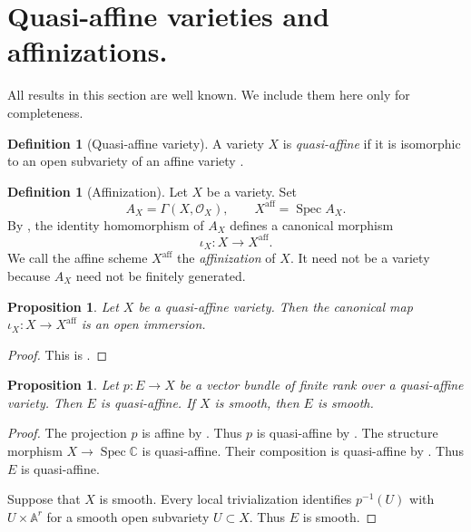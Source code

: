 \documentclass[12pt]{article}
\newtheorem{proposition}[theorem]{Proposition}
\theoremstyle{definition}
\newtheorem{definition}[theorem]{Definition}
\DeclareMathOperator{\Spec}{Spec}
\newcommand{\C}{\mathbb C}
\newcommand{\OO}{\mathcal O}
\newcommand{\aff}{\mathrm{aff}}
\begin{document}
\section{Quasi-affine varieties and affinizations.}\label{quasiaffinesection}

All results in this section are well known. We include them here only for completeness.

\begin{definition}[Quasi-affine variety]\label{quasiaffinedefinition}
    A variety $X$ is \emph{quasi-affine} if it is isomorphic to an open subvariety of an affine variety \cite[Definition~28.19.1]{Stacks}.
\end{definition}

\begin{definition}[Affinization]\label{affinizationdefinition}
    Let $X$ be a variety. Set
    \[
        A_X=\Gamma(X,\OO_X),
        \qquad
        X^\aff=\Spec A_X.
    \]
    By \cite[Lemma~26.6.4]{Stacks}, the identity homomorphism of $A_X$ defines a canonical morphism
    \[
        \iota_X:X\longrightarrow X^\aff.
    \]
    We call the affine scheme $X^\aff$ the \emph{affinization} of $X$. It need not be a variety because $A_X$ need not be finitely generated.
\end{definition}

\begin{proposition}\label{affinizationmap}
    Let $X$ be a quasi-affine variety. Then the canonical map $\iota_X:X\to X^\aff$ is an open immersion.
\end{proposition}
\begin{proof}
    This is \cite[Lemma~28.19.4]{Stacks}.
\end{proof}

\begin{proposition}\label{vectorbundlequasiaffine}
    Let $p:E\to X$ be a vector bundle of finite rank over a quasi-affine variety. Then $E$ is quasi-affine. If $X$ is smooth, then $E$ is smooth.
\end{proposition}
\begin{proof}
    The projection $p$ is affine by \cite[Definition~27.6.2]{Stacks}. Thus $p$ is quasi-affine by \cite[Definition~29.13.1]{Stacks}. The structure morphism $X\to\Spec\C$ is quasi-affine. Their composition is quasi-affine by \cite[Lemma~29.13.4]{Stacks}. Thus $E$ is quasi-affine.

    Suppose that $X$ is smooth. Every local trivialization identifies $p^{-1}(U)$ with $U\times\mathbb A^r$ for a smooth open subvariety $U\subset X$. Thus $E$ is smooth.
\end{proof}
\end{document}
